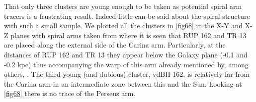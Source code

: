 \documentclass[draft]{aa}
\begin{document}
That only three clusters are young enough to be taken as potential spiral arm
tracers is a frustrating result. Indeed little can be said about the spiral
structure with such a small sample. We plotted all the clusters in 
\ref{fig68} in the X-Y and X-Z planes with spiral arms taken from 
\cite{v2005AJ} where it is seen that RUP 162 and TR 13  are placed along
the external side of the Carina arm. Particularly, at the distances of RUP 162
and TR 13 they appear below the Galaxy plane (-0.1 and -0.2 kpc) thus
accompanying the warp of this arm already mentioned by, among others, 
\cite{Cersosimo_2009}. The third young (and dubious) cluster, vdBH 162, is
relatively far from the Carina arm in an intermediate zone between this and the
Sun. Looking at \ref{fig68} there is no trace of the Perseus arm. 
\end{document}
